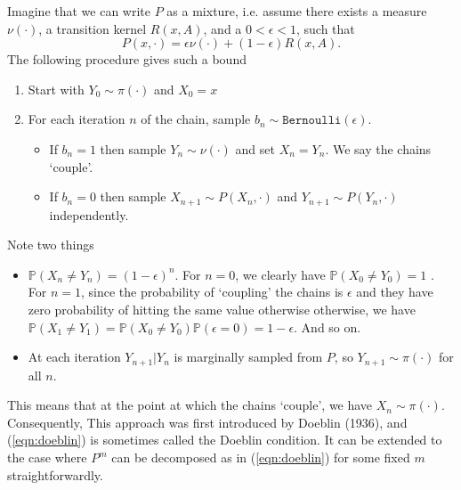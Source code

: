 \documentclass{article}
\begin{document}
Imagine that we can write $P$ as a mixture, i.e. assume there exists a measure $\nu(\cdot)$, a transition kernel $R(x,A)$, and a $0<\epsilon<1$, such that
\begin{equation} \label{eqn:doeblin}
P(x,\cdot) = \epsilon \nu(\cdot) + (1 - \epsilon)R(x,A).
\end{equation}
The following procedure gives such a bound
\begin{enumerate}
\item Start with $Y_0 \sim \pi(\cdot)$ and $X_0 = x$
\item For each iteration $n$ of the chain, sample $b_n \sim \texttt{Bernoulli}(\epsilon)$. 
\begin{itemize}
\item If $b_n = 1$ then sample $Y_n \sim \nu(\cdot)$ and set $X_n = Y_n$. We say the chains  `couple'.
\item If $b_n = 0$ then sample $X_{n+1} \sim P(X_n,\cdot)$ and $Y_{n+1} \sim P(Y_{n},\cdot)$ independently.
\end{itemize}
\end{enumerate}
Note two things
\begin{itemize}
\item $\mathbb{P}(X_n \neq Y_n) = (1-\epsilon)^n$.  For $n=0$, we clearly have $\mathbb{P}(X_0 \neq Y_0)=1$ . For $n=1$, since the probability of `coupling' the chains is $\epsilon$ and they have zero probability of hitting the same value otherwise  otherwise, we have $\mathbb{P}(X_1 \neq Y_1)=\mathbb{P}(X_0 \neq Y_0)\mathbb{P}(\epsilon=0)=1-\epsilon$. And so on.
\item At each iteration $Y_{n+1}|Y_n$ is marginally sampled from $P$, so $Y_{n+1} \sim \pi(\cdot)$ for all $n$.
\end{itemize}
This means that at the point at which the chains `couple', we have $X_n \sim \pi(\cdot)$. Consequently,  This approach was first introduced by Doeblin (1936), and (\ref{eqn:doeblin}) is sometimes called the Doeblin condition.  It can be extended to the case where $P^m$ can be decomposed as in (\ref{eqn:doeblin}) for some fixed $m$ straightforwardly.
\end{document}
